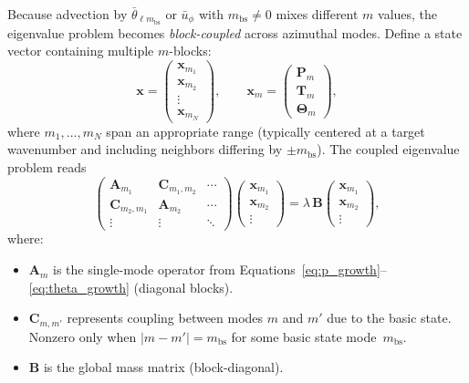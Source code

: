 \documentclass[11pt]{article}
\numberwithin{equation}{section}
\begin{document}
Because advection by $\bar{\theta}_{\ell m_{\text{bs}}}$ or $\bar{u}_\phi$ with $m_{\text{bs}}\neq0$ mixes different $m$ values, the eigenvalue problem becomes \emph{block-coupled} across azimuthal modes. Define a state vector containing multiple $m$-blocks:
\begin{equation}
  \bm{x} = \begin{pmatrix} \bm{x}_{m_1} \\ \bm{x}_{m_2} \\ \vdots \\ \bm{x}_{m_N} \end{pmatrix},
  \qquad
  \bm{x}_m = \begin{pmatrix} \bm{P}_m \\ \bm{T}_m \\ \bm{\Theta}_m \end{pmatrix},
  \label{eq:state_vector_triglobal}
\end{equation}
where $m_1,\ldots,m_N$ span an appropriate range (typically centered at a target wavenumber and including neighbors differing by $\pm m_{\text{bs}}$). The coupled eigenvalue problem reads
\begin{equation}
  \begin{pmatrix}
    \bm{A}_{m_1}       & \bm{C}_{m_1,m_2} & \cdots  \\
    \bm{C}_{m_2,m_1}   & \bm{A}_{m_2}     & \cdots  \\
    \vdots             & \vdots           & \ddots
  \end{pmatrix}
  \begin{pmatrix} \bm{x}_{m_1} \\ \bm{x}_{m_2} \\ \vdots \end{pmatrix}
  =
  \lambda \,
  \bm{B}
  \begin{pmatrix} \bm{x}_{m_1} \\ \bm{x}_{m_2} \\ \vdots \end{pmatrix},
  \label{eq:triglobal_eigenproblem}
\end{equation}
where:
\begin{itemize}
  \item $\bm{A}_m$ is the single-mode operator from Equations~\eqref{eq:p_growth}--\eqref{eq:theta_growth} (diagonal blocks).
  \item $\bm{C}_{m,m'}$ represents coupling between modes $m$ and $m'$ due to the basic state. Nonzero only when $|m-m'|=m_{\text{bs}}$ for some basic state mode~$m_{\text{bs}}$.
  \item $\bm{B}$ is the global mass matrix (block-diagonal).
\end{itemize}
\end{document}
